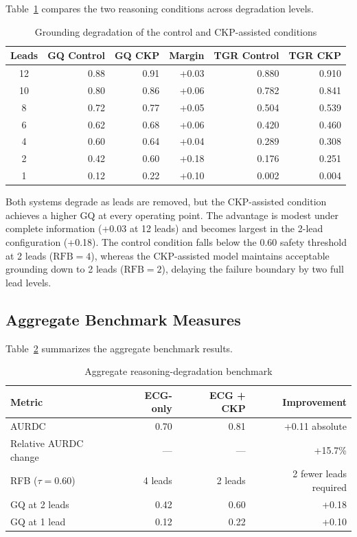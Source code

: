 \documentclass{ssnreview}
\begin{document}
Table~\ref{tab:grounding-results} compares the two reasoning conditions across degradation levels.

\begin{table}[H]
  \centering
  \small
  \caption{Grounding degradation of the control and CKP-assisted conditions}
  \label{tab:grounding-results}
  \begin{tabular}{@{}crrrrr@{}}
    \toprule
    \textbf{Leads} &
    \textbf{GQ Control} &
    \textbf{GQ CKP} &
    \textbf{Margin} &
    \textbf{TGR Control} &
    \textbf{TGR CKP} \\
    \midrule
    12 & 0.88 & 0.91 & +0.03 & 0.880 & 0.910 \\
    10 & 0.80 & 0.86 & +0.06 & 0.782 & 0.841 \\
    8  & 0.72 & 0.77 & +0.05 & 0.504 & 0.539 \\
    6  & 0.62 & 0.68 & +0.06 & 0.420 & 0.460 \\
    4  & 0.60 & 0.64 & +0.04 & 0.289 & 0.308 \\
    2  & 0.42 & 0.60 & +0.18 & 0.176 & 0.251 \\
    1  & 0.12 & 0.22 & +0.10 & 0.002 & 0.004 \\
    \bottomrule
  \end{tabular}
\end{table}

Both systems degrade as leads are removed, but the CKP-assisted condition achieves a higher
GQ at every operating point. The advantage is modest under complete information (+0.03 at
12 leads) and becomes largest in the 2-lead configuration (+0.18). The control condition falls
below the 0.60 safety threshold at 2 leads ($\mathrm{RFB} = 4$), whereas the CKP-assisted model
maintains acceptable grounding down to 2 leads ($\mathrm{RFB} = 2$), delaying the failure
boundary by two full lead levels.

\subsection{Aggregate Benchmark Measures}

Table~\ref{tab:aggregate-results} summarizes the aggregate benchmark results.

\begin{table}[H]
  \centering
  \caption{Aggregate reasoning-degradation benchmark}
  \label{tab:aggregate-results}
  \begin{tabular}{@{}lrrr@{}}
    \toprule
    \textbf{Metric} & \textbf{ECG-only} & \textbf{ECG + CKP} &
    \textbf{Improvement} \\
    \midrule
    AURDC & 0.70 & 0.81 & +0.11 absolute \\
    Relative AURDC change & --- & --- & +15.7\% \\
    RFB ($\tau=0.60$) & 4 leads & 2 leads & 2 fewer leads required \\
    GQ at 2 leads & 0.42 & 0.60 & +0.18 \\
    GQ at 1 lead & 0.12 & 0.22 & +0.10 \\
    \bottomrule
  \end{tabular}
\end{table}
\end{document}
